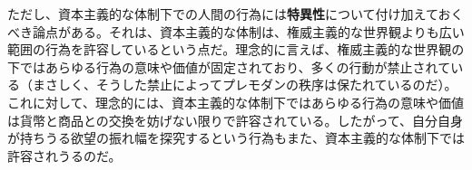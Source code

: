 ただし、資本主義的な体制下での人間の行為には\textbf{特異性}について付け加えておくべき論点がある。それは、資本主義的な体制は、権威主義的な世界観よりも広い範囲の行為を許容しているという点だ。理念的に言えば、権威主義的な世界観の下ではあらゆる行為の意味や価値が固定されており、多くの行動が禁止されている（まさしく、そうした禁止によってプレモダンの秩序は保たれているのだ）。これに対して、理念的には、資本主義的な体制下ではあらゆる行為の意味や価値は貨幣と商品との交換を妨げない限りで許容されている。したがって、自分自身が持ちうる欲望の振れ幅を探究するという行為もまた、資本主義的な体制下では許容されうるのだ。
